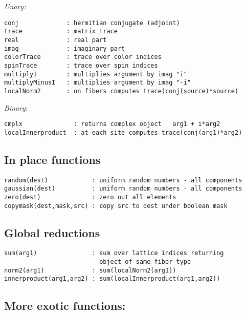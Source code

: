 \documentclass[12pt,letterpaper]{article}
\begin{document}
\noindent
{\em Unary:}

\begin{verbatim}
conj             : hermitian conjugate (adjoint)
trace            : matrix trace
real             : real part
imag             : imaginary part
colorTrace       : trace over color indices
spinTrace        : trace over spin indices
multiplyI        : multiplies argument by imag "i"
multiplyMinusI   : multiplies argument by imag "-i"
localNorm2       : on fibers computes trace(conj(source)*source)
\end{verbatim}


\noindent
{\em Binary}:

\begin{verbatim}
cmplx              : returns complex object   arg1 + i*arg2
localInnerproduct  : at each site computes trace(conj(arg1)*arg2)
\end{verbatim}

\subsection{In place functions}
\label{sec:inplace}

\begin{verbatim}
random(dest)            : uniform random numbers - all components
gaussian(dest)          : uniform random numbers - all components
zero(dest)              : zero out all elements
copymask(dest,mask,src) : copy src to dest under boolean mask
\end{verbatim}

\medskip


\subsection{Global reductions}
\label{sec:reductions}

\begin{verbatim}
sum(arg1)               : sum over lattice indices returning 
                          object of same fiber type
norm2(arg1)             : sum(localNorm2(arg1))
innerproduct(arg1,arg2) : sum(localInnerproduct(arg1,arg2))
\end{verbatim}


\medskip

\subsection{More exotic functions:}
\label{sec:otherfuncs}
\end{document}
